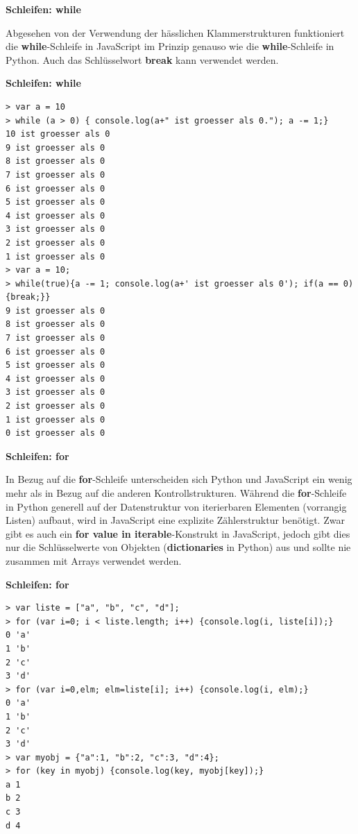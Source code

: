 \vspace{0.5cm}\par\noindent\textbf{Schleifen: while}\vspace{0.5cm}

Abgesehen von der Verwendung der hässlichen Klammerstrukturen
funktioniert die \textbf{while}-Schleife in JavaScript im Prinzip
genauso wie die \textbf{while}-Schleife in Python. Auch das
Schlüsselwort \textbf{break} kann verwendet werden.




\vspace{0.5cm}\par\noindent\textbf{Schleifen: while}\vspace{0.5cm}

\begin{verbatim}
> var a = 10
> while (a > 0) { console.log(a+" ist groesser als 0."); a -= 1;}
10 ist groesser als 0
9 ist groesser als 0
8 ist groesser als 0
7 ist groesser als 0
6 ist groesser als 0
5 ist groesser als 0
4 ist groesser als 0
3 ist groesser als 0
2 ist groesser als 0
1 ist groesser als 0
> var a = 10;
> while(true){a -= 1; console.log(a+' ist groesser als 0'); if(a == 0){break;}}
9 ist groesser als 0 
8 ist groesser als 0 
7 ist groesser als 0 
6 ist groesser als 0 
5 ist groesser als 0 
4 ist groesser als 0 
3 ist groesser als 0 
2 ist groesser als 0 
1 ist groesser als 0 
0 ist groesser als 0 
\end{verbatim}




\vspace{0.5cm}\par\noindent\textbf{Schleifen: for}\vspace{0.5cm}

In Bezug auf die \textbf{for}-Schleife unterscheiden sich Python und
JavaScript ein wenig mehr als in Bezug auf die anderen
Kontrollstrukturen. Während die \textbf{for}-Schleife in Python generell
auf der Datenstruktur von iterierbaren Elementen (vorrangig Listen)
aufbaut, wird in JavaScript eine explizite Zählerstruktur benötigt. Zwar
gibt es auch ein \textbf{for value in iterable}-Konstrukt in JavaScript,
jedoch gibt dies nur die Schlüsselwerte von Objekten
(\textbf{dictionaries} in Python) aus und sollte nie zusammen mit Arrays
verwendet werden.




\vspace{0.5cm}\par\noindent\textbf{Schleifen: for}\vspace{0.5cm}

\begin{verbatim}
> var liste = ["a", "b", "c", "d"];
> for (var i=0; i < liste.length; i++) {console.log(i, liste[i]);}
0 'a'
1 'b'
2 'c'
3 'd'
> for (var i=0,elm; elm=liste[i]; i++) {console.log(i, elm);}
0 'a'
1 'b'
2 'c'
3 'd'
> var myobj = {"a":1, "b":2, "c":3, "d":4};
> for (key in myobj) {console.log(key, myobj[key]);}
a 1
b 2
c 3
d 4
\end{verbatim}

